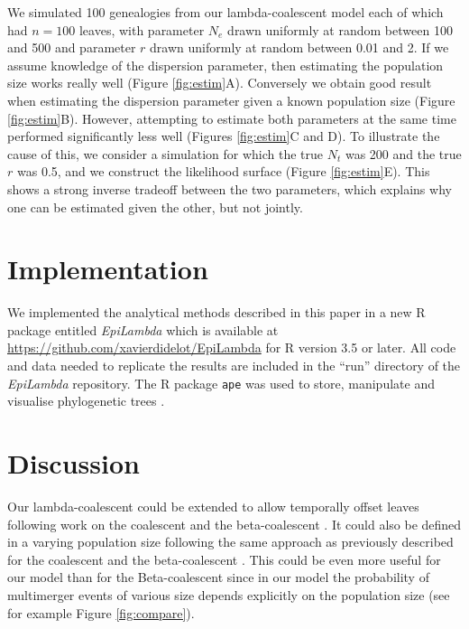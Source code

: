 \documentclass{article}
\begin{document}
We simulated 100 genealogies from our lambda-coalescent model each of which had
$n=100$ leaves, with parameter $N_e$ drawn uniformly at random between 100 and 500
and parameter $r$ drawn uniformly at random between 0.01 and 2.
If we assume knowledge of the dispersion parameter, then estimating the population size 
works really well (Figure \ref{fig:estim}A). Conversely we obtain good result when 
estimating the dispersion parameter given a known population size 
(Figure \ref{fig:estim}B). However, attempting to estimate both parameters at the same
time performed significantly less well (Figures \ref{fig:estim}C and D). 
To illustrate the cause of this, we consider a simulation for which the true $N_t$ was 200
and the true $r$ was 0.5, and we construct the likelihood surface (Figure \ref{fig:estim}E).
This shows a strong inverse tradeoff between the two parameters, which explains why
one can be estimated given the other, but not jointly.

\section{Implementation}

We implemented the analytical methods described in this paper in a 
new R package entitled \emph{EpiLambda} which is available
at \url{https://github.com/xavierdidelot/EpiLambda} for R version 3.5 or later. 
All code and data needed to replicate the results are included in the ``run'' directory of the \emph{EpiLambda} repository.
The R package \verb+ape+ was used to store, manipulate and visualise phylogenetic trees
\citep{Paradis2019}.

\section{Discussion}

Our lambda-coalescent could be extended to allow temporally offset leaves 
following work on the coalescent \citep{Drummond2003} and the beta-coalescent
\citep{Hoscheit2019}.
It could also be defined in a varying population size 
following the same approach as previously described for
the coalescent \citep{Griffiths1994,Pybus2000,Ho2011skylinereview} and the beta-coalescent \citep{Hoscheit2019,zhangMultipleMergerCoalescent2024}.
This could be even more useful for our model than for the Beta-coalescent
since in our model the probability of multimerger events of various size
depends explicitly on the population size (see for example Figure \ref{fig:compare}).
\end{document}
